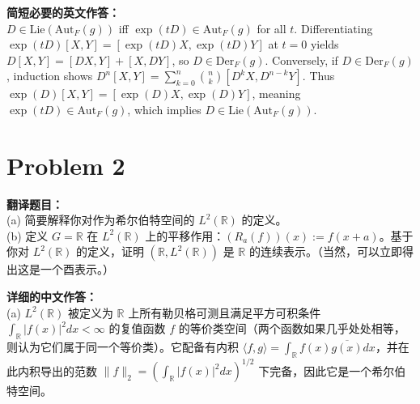 \documentclass{ctexart}
\begin{document}
\vspace{1em}
\textbf{简短必要的英文作答：}\\
$D \in \text{Lie}(\text{Aut}_F(g))$ iff $\exp(tD) \in \text{Aut}_F(g)$ for all $t$. Differentiating $\exp(tD)[X,Y] = [\exp(tD)X, \exp(tD)Y]$ at $t=0$ yields $D[X,Y] = [DX,Y] + [X,DY]$, so $D \in \text{Der}_F(g)$. Conversely, if $D \in \text{Der}_F(g)$, induction shows $D^n[X,Y] = \sum_{k=0}^n \binom{n}{k} [D^k X, D^{n-k}Y]$. Thus $\exp(D)[X,Y] = [\exp(D)X, \exp(D)Y]$, meaning $\exp(tD) \in \text{Aut}_F(g)$, which implies $D \in \text{Lie}(\text{Aut}_F(g))$.

\vspace{2em}
\section*{Problem 2}
\textbf{翻译题目：}\\
(a) 简要解释你对作为希尔伯特空间的 $L^2(\mathbb{R})$ 的定义。\\
(b) 定义 $G = \mathbb{R}$ 在 $L^2(\mathbb{R})$ 上的平移作用：$(R_a(f))(x) := f(x+a)$。基于你对 $L^2(\mathbb{R})$ 的定义，证明 $(\mathbb{R}, L^2(\mathbb{R}))$ 是 $\mathbb{R}$ 的连续表示。（当然，可以立即得出这是一个酉表示。）

\vspace{1em}
\textbf{详细的中文作答：}\\
(a) $L^2(\mathbb{R})$ 被定义为 $\mathbb{R}$ 上所有勒贝格可测且满足平方可积条件 $\int_{\mathbb{R}} |f(x)|^2 dx < \infty$ 的复值函数 $f$ 的等价类空间（两个函数如果几乎处处相等，则认为它们属于同一个等价类）。它配备有内积 $\langle f, g \rangle = \int_{\mathbb{R}} f(x) \overline{g(x)} dx$，并在此内积导出的范数 $\|f\|_2 = \left(\int_{\mathbb{R}} |f(x)|^2 dx\right)^{1/2}$ 下完备，因此它是一个希尔伯特空间。
\end{document}
